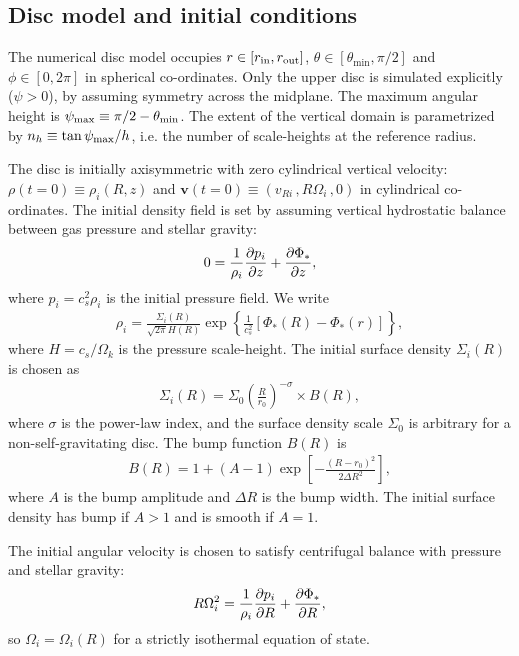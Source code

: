 \subsection{Disc model and initial conditions}\label{IC}
The numerical disc model occupies $r\in[r_\mathrm{in},r_\mathrm{out}]$, $\theta\in[\theta_\mathrm{min},
  \pi/2]$ and $\phi\in[0,2\pi]$ in spherical co-ordinates. 
Only the upper disc is simulated explicitly 
($\psi>0$), by assuming symmetry across the midplane. The maximum
angular height is $\psi_\mathrm{max} \equiv \pi/2 - \theta_\mathrm{min}$. 
The extent of the vertical domain is parametrized by $n_h\equiv
\tan{\psi_\mathrm{max}}/h$, i.e. the number of scale-heights at the reference 
radius.   

The disc is initially axisymmetric with zero cylindrical vertical
velocity: $\rho(t=0)\equiv\rho_i(R,z)$ and
$\bm{v}(t=0)\equiv(v_{Ri}\,, R\Omega_i\,, 0)$ in cylindrical
co-ordinates. The initial density field is set by assuming vertical
hydrostatic balance between gas pressure and stellar gravity:
\begin{align}\label{vert_balance}
  0 = \frac{1}{\rho_i}\frac{\partial p_i}{\partial z} + \frac{\partial \Phi_*}{\partial z},
\end{align}
where $p_i=c_s^2\rho_i$ is the initial pressure field. We write 
\begin{align}\label{init_den}
  \rho_i = \frac{\Sigma_i(R)}{\sqrt{2\pi}H(R)}
  \exp{\left\{\frac{1}{c_s^2}\left[\Phi_*(R) - \Phi_*(r)\right]\right\}},
\end{align}
where $H = c_s/\Omega_k$ is the pressure scale-height. The initial
surface density $\Sigma_i(R)$ is chosen as  
\begin{align}
  \Sigma_i(R) = \Sigma_0\left(\frac{R}{r_0}\right)^{-\sigma}\times B(R),
\end{align}
where $\sigma$ is the power-law index, and the surface density scale $\Sigma_0$ 
is arbitrary for a non-self-gravitating disc. 
The bump function $B(R)$ is 
\begin{align}
B(R) = 1 + \left(A - 1\right)\exp{\left[-\frac{(R-r_0)^2}{2\Delta R^2}\right]},
\end{align}
where $A$ is the bump amplitude and $\Delta R$ is the bump width. The initial surface 
density has bump if $A>1$ and is smooth if $A=1$. 

The initial angular velocity is chosen to 
satisfy centrifugal balance with pressure and stellar gravity: 
\begin{align}\label{init_vphi} 
  R\Omega^2_i = \frac{1}{\rho_i}\frac{\partial p_i}{\partial
    R} + \frac{\partial\Phi_*}{\partial R},  
\end{align}
so $\Omega_i=\Omega_i(R)$ for a strictly isothermal equation of
state. %

